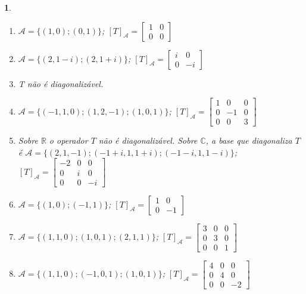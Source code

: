 \documentclass[12pt]{exam}
\newtheorem{exercicio}{}
\newcommand{\real}{\mathbb{R}}
\newcommand{\complex}{\mathbb{C}}
\begin{document}
\begin{exercicio}
\begin{enumerate}[label=({\alph*})]
  \end{enumerate}
  \begin{solucao}
      \begin{enumerate}[label=({\alph*})]
          \item $\mathcal{A} = \{(1,0);(0,1)\}$; $[T]_\mathcal{A} = \begin{bmatrix} 1 & 0\\ 0 & 0\end{bmatrix}$
          \item $\mathcal{A} = \{(2,1 - i);(2,1 + i)\}$; $[T]_\mathcal{A} = \begin{bmatrix} i & 0\\ 0 & -i\end{bmatrix}$
          \item T n\~ao \'e diagonaliz\'avel.
          \item $\mathcal{A} = \{(-1,1,0);(1,2,-1);(1,0,1)\}$; $[T]_\mathcal{A} = \begin{bmatrix} 1 & 0 & 0\\ 0 & -1 & 0\\0 & 0 & 3\end{bmatrix}$
          \item Sobre $\real$ o operador $T$ n\~ao \'e diagonaliz\'avel. Sobre $\complex$, a base que diagonaliza $T$ \'e $\mathcal{A} = \{(2,1,-1);(-1 + i, 1, 1 + i);(-1 - i, 1, 1 - i)\}$; $[T]_\mathcal{A} = \begin{bmatrix} -2 & 0 & 0\\ 0 & i & 0\\ 0 & 0 & -i\end{bmatrix}$
          \item $\mathcal{A} = \{(1,0);(-1,1)\}$; $[T]_\mathcal{A} = \begin{bmatrix} 1 & 0\\ 0 & -1\end{bmatrix}$
          \item $\mathcal{A} = \{(1,1,0);(1,0,1);(2,1,1)\}$; $[T]_\mathcal{A} = \begin{bmatrix} 3 & 0 & 0\\ 0 & 3 & 0\\ 0 & 0 & 1\end{bmatrix}$
          \item $\mathcal{A} = \{(1,1,0);(-1,0,1);(1,0,1)\}$; $[T]_\mathcal{A} = \begin{bmatrix} 4 & 0 & 0\\ 0 & 4 & 0\\ 0 & 0 & -2\end{bmatrix}$
        \end{enumerate}
  \end{solucao}
\end{exercicio}
\end{document}
